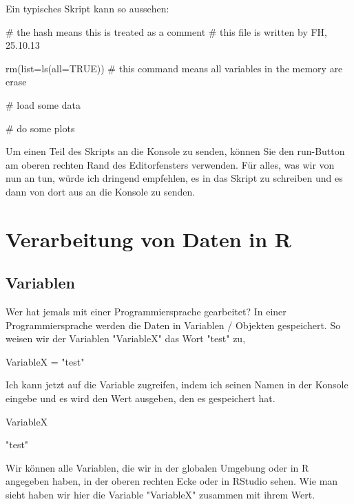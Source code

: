 \documentclass[a4paper,twoside]{tufte-book}\usepackage[]{graphicx}\usepackage[]{color}
\begin{document}
\begin{Anhang}
Ein typisches Skript kann so aussehen:

\begin{Schunk}
\begin{Sinput}
# the hash means this is treated as a comment
# this file is written by FH, 25.10.13

rm(list=ls(all=TRUE))  # this command means all variables in the memory are erase

# load some data

# do some plots
\end{Sinput}
\end{Schunk}

Um einen Teil des Skripts an die Konsole zu senden, können Sie den run-Button am oberen rechten Rand des Editorfensters verwenden. Für alles, was wir von nun an tun, würde ich dringend empfehlen, es in das Skript zu schreiben und es dann von dort aus an die Konsole zu senden.

\chapter{Verarbeitung von Daten in R}
\label{HandlingDataInR}

\section{Variablen}

Wer hat jemals mit einer Programmiersprache gearbeitet? In einer Programmiersprache werden die Daten in Variablen / Objekten gespeichert. So weisen wir der Variablen "VariableX" das Wort "test" zu,

\begin{Schunk}
\begin{Sinput}
VariableX = "test"
\end{Sinput}
\end{Schunk}

Ich kann jetzt auf die Variable zugreifen, indem ich seinen Namen in der Konsole eingebe und es wird den Wert ausgeben, den es gespeichert hat.
\begin{Schunk}
\begin{Sinput}
VariableX
\end{Sinput}
\begin{Soutput}
[1] "test"
\end{Soutput}
\end{Schunk}

Wir können alle Variablen, die wir in der globalen Umgebung oder in R angegeben haben, in der oberen rechten Ecke oder in RStudio sehen. Wie man sieht haben wir hier die Variable "VariableX" zusammen mit ihrem Wert.



\end{Anhang}
\end{document}
